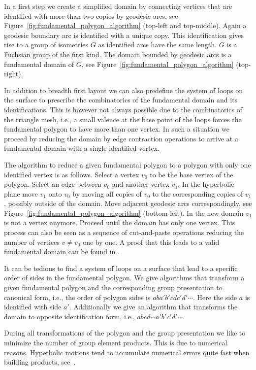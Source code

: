 \documentclass[Thesis.tex]{subfiles}
\begin{document}
In a first step we create a simplified domain by connecting vertices that are identified with more than two copies by geodesic arcs, see Figure~\ref{fig:fundamental_polygon_algorithm} (top-left and top-middle). Again a geodesic boundary arc is identified with a unique copy. This identification gives rise to a group of isometries $G$ as identified arcs have the same length. $G$ is a Fuchsian group of the first kind. The domain bounded by geodesic arcs is a fundamental domain of $G$, see Figure~\ref{fig:fundamental_polygon_algorithm} (top-right).

In addition to breadth first layout we can also predefine the system of loops on the surface to prescribe the combinatorics of the fundamental domain and its identifications. This is however not always possible due to the combinatorics of the triangle mesh, i.e., a small valence at the base point of the loops forces the fundamental polygon to have more than one vertex. In such a situation we proceed by reducing the domain by edge contraction operations to arrive at a fundamental domain with a single identified vertex.

The algorithm to reduce a given fundamental polygon to a polygon with only one identified vertex is as follows. Select a vertex $v_0$ to be the base vertex of the polygon. Select an edge between $v_0$ and another vertex $v_1$. In the hyperbolic plane move $v_1$ onto $v_0$ by moving all copies of $v_0$ to the corresponding copies of $v_1$, possibly outside of the domain. Move adjacent geodesic arcs correspondingly, see Figure~\ref{fig:fundamental_polygon_algorithm} (bottom-left). In the new domain $v_1$ is not a vertex anymore. Proceed until the domain has only one vertex. This process can also be seen as a sequence of cut-and-paste operations reducing the number of vertices $v\neq v_0$ one by one. A proof that this leads to a valid fundamental domain can be found in \cite[p. 48]{Jost2007}.

It can be tedious to find a system of loops on a surface that lead to a specific order of sides in the fundamental polygon. We give algorithms that transform a given fundamental polygon and the corresponding group presentation to canonical form, i.e., the order of polygon sides is $aba'b'cdc'd'\cdots$. Here the side $a$ is identified with side $a'$. Additionally we give an algorithm that transforms the domain to opposite identification form, i.e., $abcd\cdots a'b'c'd'\cdots$.

During all transformations of the polygon and the group presentation we like to minimize the number of group element products. This is due to numerical reasons. Hyperbolic motions tend to accumulate numerical errors quite fast when building products, see~\cite{Floyd2002}.
\end{document}
